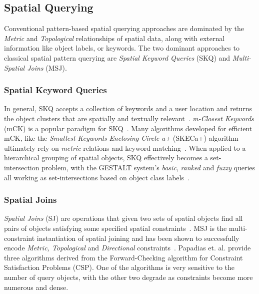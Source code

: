 \subsection{Spatial Querying}

\par{
    Conventional pattern-based spatial querying approaches are dominated by the \textit{Metric} and \textit{Topological} relationships of spatial data, along with external information like object labels, or keywords. 
    The two dominant approaches to classical spatial pattern querying are \textit{Spatial Keyword Queries} (SKQ) and \textit{Multi-Spatial Joins} (MSJ).} 
\subsubsection{Spatial Keyword Queries}
\par{
    In general, SKQ accepts a collection of keywords and a user location and returns the object clusters that are spatially and textually relevant~\cite{Cao2012}.
    \textit{m-Closest Keywords} (mCK) is a popular paradigm for SKQ~\cite{Zhang2009}.
    Many algorithms developed for efficient mCK, like the \textit{Smallest Keywords Enclosing Circle a+} (SKECa+) algorithm  ultimately rely on \textit{metric} relations and keyword matching~\cite{Guo2015}. 
    When applied to a hierarchical grouping of spatial objects, SKQ effectively becomes a set-intersection problem, with the GESTALT system's \textit{basic}, \textit{ranked} and \textit{fuzzy} queries all working as set-intersections based on object class labels~\cite{Osul2023}.
    }
\subsubsection{Spatial Joins}
\par{
    \textit{Spatial Joins} (SJ) are operations that given two sets of spatial objects find all pairs of objects satisfying some specified spatial constraints~\cite{Jacox2007}.
    MSJ is the multi-constraint instantiation of spatial joining and has been shown to successfully encode \textit{Metric, Topological} and \textit{Directional} constraints~\cite{Papadias1998}.
    Papadias et. al. provide three algorithms derived from the Forward-Checking algorithm for Constraint Satisfaction Problems (CSP). One of the algorithms is very sensitive to the number of query objects, with the other two degrade as constraints become more numerous and dense. 
}
